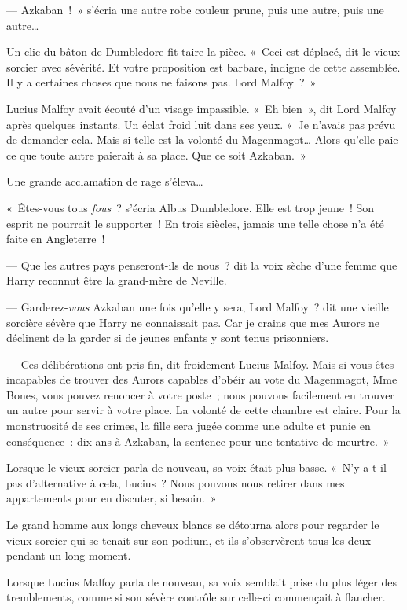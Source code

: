 --- Azkaban~!~» s'écria une autre robe couleur prune, puis une autre, puis une autre…

Un clic du bâton de Dumbledore fit taire la pièce. «~Ceci est déplacé, dit le vieux sorcier avec sévérité. Et votre proposition est barbare, indigne de cette assemblée. Il y a certaines choses que nous ne faisons pas. Lord Malfoy~?~»

Lucius Malfoy avait écouté d'un visage impassible. «~Eh bien~», dit Lord Malfoy après quelques instants. Un éclat froid luit dans ses yeux. «~Je n'avais pas prévu de demander cela. Mais si telle est la volonté du Magenmagot… Alors qu'elle paie ce que toute autre paierait à sa place. Que ce soit Azkaban.~»

Une grande acclamation de rage s'éleva…

«~Êtes-vous tous \emph{fous}~? s'écria Albus Dumbledore. Elle est trop jeune~! Son esprit ne pourrait le supporter~! En trois siècles, jamais une telle chose n'a été faite en Angleterre~!

--- Que les autres pays penseront-ils de nous~? dit la voix sèche d'une femme que Harry reconnut être la grand-mère de Neville.

--- Garderez-\emph{vous} Azkaban une fois qu'elle y sera, Lord Malfoy~? dit une vieille sorcière sévère que Harry ne connaissait pas. Car je crains que mes Aurors ne déclinent de la garder si de jeunes enfants y sont tenus prisonniers.

--- Ces délibérations ont pris fin, dit froidement Lucius Malfoy. Mais si vous êtes incapables de trouver des Aurors capables d'obéir au vote du Magenmagot, Mme Bones, vous pouvez renoncer à votre poste~; nous pouvons facilement en trouver un autre pour servir à votre place. La volonté de cette chambre est claire. Pour la monstruosité de ses crimes, la fille sera jugée comme une adulte et punie en conséquence~: dix ans à Azkaban, la sentence pour une tentative de meurtre.~»

Lorsque le vieux sorcier parla de nouveau, sa voix était plus basse. «~N'y a-t-il pas d'alternative à cela, Lucius~? Nous pouvons nous retirer dans mes appartements pour en discuter, si besoin.~»

Le grand homme aux longs cheveux blancs se détourna alors pour regarder le vieux sorcier qui se tenait sur son podium, et ils s'observèrent tous les deux pendant un long moment.

Lorsque Lucius Malfoy parla de nouveau, sa voix semblait prise du plus léger des tremblements, comme si son sévère contrôle sur celle-ci commençait à flancher.

